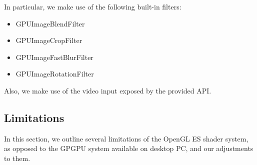 In particular, we make use of the following built-in filters: 
\begin{itemize}
 \item  GPUImageBlendFilter
 \item   GPUImageCropFilter
 \item GPUImageFastBlurFilter
 \item GPUImageRotationFilter
\end{itemize} 
Also, we make use of the video input exposed by the provided API. 

\subsection{Limitations}
In this section, we outline several limitations of the OpenGL ES shader system,  as opposed to the GPGPU system available on desktop PC, and our adjustments to them.
